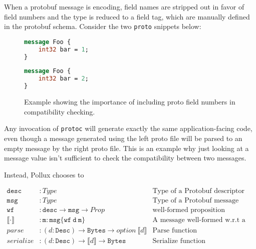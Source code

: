 \documentclass[11pt]{article}
\theoremstyle{definition}
\theoremstyle{plain}
\begin{document}
When a protobuf message is encoding, field names are stripped out in favor of
field numbers and the type is reduced to a field tag, which are manually defined in the protobuf
schema. Consider the two \texttt{proto} snippets below:

\begin{figure}[H]
	\centering
	\begin{minipage}[bt]{0.4\textwidth}
		\begin{lstlisting}[language=proto]
message Foo {
    int32 bar = 1;
}\end{lstlisting}
	\end{minipage}
	\hspace{1cm}
	\begin{minipage}[bt]{0.4\textwidth}
		\begin{lstlisting}[language=proto]
message Foo {
    int32 bar = 2;
}\end{lstlisting}
	\end{minipage}

	\caption[]{Example showing the importance of including proto field numbers in
		compatibility checking.}
\end{figure}
Any invocation of \texttt{protoc} will generate exactly the same
application-facing code, even though a message generated using the left proto
file will be parsed to an empty message by the right proto file. This is an
example why just looking at a message value isn't sufficient to check the
compatibility between two messages. 

Instead, Pollux chooses to 

\[
\begin{array}{rll}
	\mathtt{desc}            & : Type & \text{Type of a Protobuf descriptor} \\
	\mathtt{msg}             & : Type & \text{Type of a Protobuf message value}  \\
    \mathtt{wf}              & : \mathtt{desc} \rightarrow \mathtt{msg} \to Prop &
                               \text{well-formed proposition} \\
	\llbracket \cdot \rrbracket & : \mathtt{m:msg\{wf\ d\ m\}} & \text{A message
                              well-formed w.r.t a descriptor} \\
	parse                       & : (d:\mathtt{Desc}) \rightarrow \mathtt{Bytes} \rightarrow option\
	\llbracket d \rrbracket     & \text{Parse function} \\
	serialize                   & : (d:\mathtt{Desc}) \rightarrow \llbracket d \rrbracket
                                  \rightarrow \mathtt{Bytes} & \text{Serialize function}
\end{array}
\]
\end{document}
